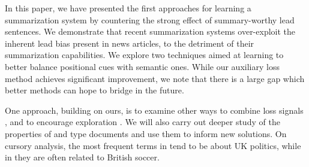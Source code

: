 In this paper, we have presented the first 
approaches for learning a summarization system 
by countering the strong effect of summary-worthy 
lead sentences. We demonstrate that recent 
summarization systems over-exploit the inherent 
lead bias present in news articles, to the 
detriment of their summarization capabilities. 
We explore two techniques aimed at learning to 
better balance positional cues with semantic ones.
While our auxiliary loss method achieves 
significant improvement, we note that there is 
a large gap which better methods can
hope to bridge in the future.

One approach, building on ours, is to examine 
other ways to combine loss signals \parencite{maml}, 
and to encourage exploration \parencite{sac}. 
We will also carry out deeper study of the properties 
of \Dearly{} and \Dlate{} type 
documents and use them to inform new solutions. 
On cursory analysis, the most frequent terms in 
\Dearly{} tend to be about UK politics, while 
in \Dlate{} they are often related to British soccer. 